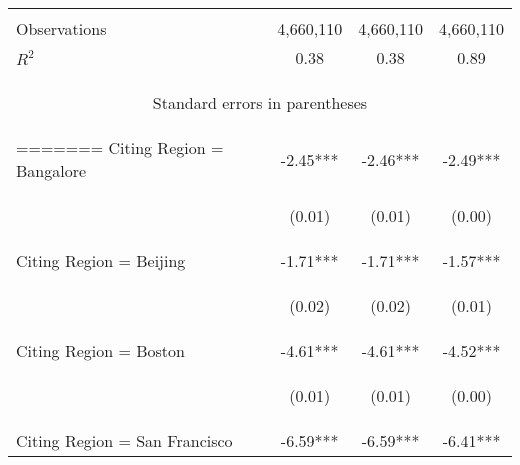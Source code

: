 \begin{center}
\begin{tabular}{lccc}
\vspace{4pt} & \begin{footnotesize}\end{footnotesize} & \begin{footnotesize}\end{footnotesize} & \begin{footnotesize}\end{footnotesize} \\
Observations & 4,660,110 & 4,660,110 & 4,660,110 \\
 $R^2$ & 0.38 & 0.38 & 0.89 \\ \hline
\multicolumn{4}{c}{\begin{footnotesize} Standard errors in parentheses\end{footnotesize}} \\
=======
Citing Region = Bangalore & -2.45*** & -2.46*** & -2.49*** \\
\vspace{4pt} & \begin{footnotesize}(0.01)\end{footnotesize} & \begin{footnotesize}(0.01)\end{footnotesize} & \begin{footnotesize}(0.00)\end{footnotesize} \\
Citing Region = Beijing & -1.71*** & -1.71*** & -1.57*** \\
\vspace{4pt} & \begin{footnotesize}(0.02)\end{footnotesize} & \begin{footnotesize}(0.02)\end{footnotesize} & \begin{footnotesize}(0.01)\end{footnotesize} \\
Citing Region = Boston & -4.61*** & -4.61*** & -4.52*** \\
\vspace{4pt} & \begin{footnotesize}(0.01)\end{footnotesize} & \begin{footnotesize}(0.01)\end{footnotesize} & \begin{footnotesize}(0.00)\end{footnotesize} \\
Citing Region = San Francisco & -6.59*** & -6.59*** & -6.41*** \\

\end{tabular}
\end{center}
